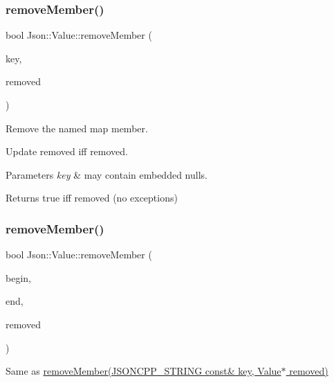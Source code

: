 \subsubsection{\texorpdfstring{remove\+Member()}{removeMember()}\hspace{0.1cm}{\footnotesize\ttfamily [4/10]}}
{\footnotesize\ttfamily bool Json\+::\+Value\+::remove\+Member (\begin{DoxyParamCaption}\item[{\hyperlink{config_8h_a1e723f95759de062585bc4a8fd3fa4be}{J\+S\+O\+N\+C\+P\+P\+\_\+\+S\+T\+R\+I\+NG} const \&}]{key,  }\item[{\hyperlink{class_json_1_1_value}{Value} $\ast$}]{removed }\end{DoxyParamCaption})}



Remove the named map member. 

Update \textquotesingle{}removed\textquotesingle{} iff removed. 
\begin{DoxyParams}{Parameters}
{\em key} & may contain embedded nulls. \\
\hline
\end{DoxyParams}
\begin{DoxyReturn}{Returns}
true iff removed (no exceptions) 
\end{DoxyReturn}
\hypertarget{class_json_1_1_value_a49c91af727d6b4eb0af02a81bb2def87}{}\label{class_json_1_1_value_a49c91af727d6b4eb0af02a81bb2def87} 
\subsubsection{\texorpdfstring{remove\+Member()}{removeMember()}\hspace{0.1cm}{\footnotesize\ttfamily [5/10]}}
{\footnotesize\ttfamily bool Json\+::\+Value\+::remove\+Member (\begin{DoxyParamCaption}\item[{const char $\ast$}]{begin,  }\item[{const char $\ast$}]{end,  }\item[{\hyperlink{class_json_1_1_value}{Value} $\ast$}]{removed }\end{DoxyParamCaption})}



Same as \hyperlink{class_json_1_1_value_ae385ecef98427970df525ee876e9f54a}{remove\+Member(\+J\+S\+O\+N\+C\+P\+P\+\_\+\+S\+T\+R\+I\+N\+G const\& key, Value$\ast$ removed)} 

